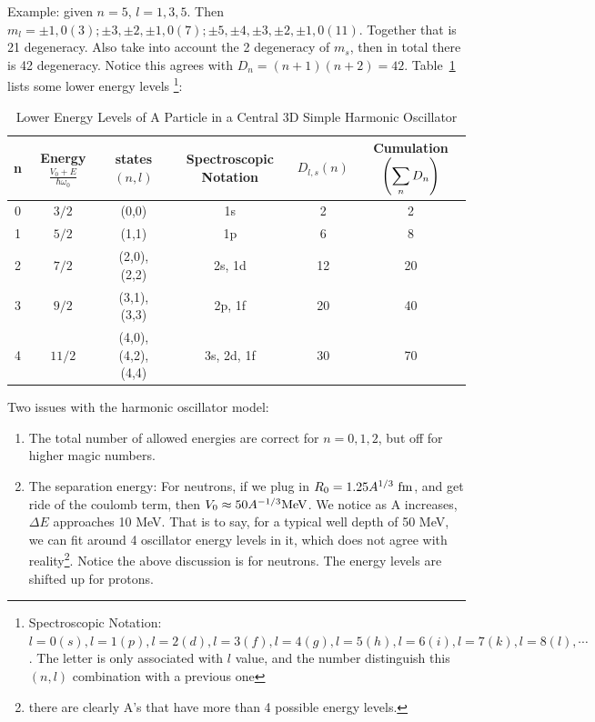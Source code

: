 \documentclass{school-22.101-notes}
\begin{document}
Example: given $n =5$, $l = 1,3,5$. Then $ m_l = \pm 1, 0 (3); \pm 3, \pm 2, \pm 1, 0 (7); \pm 5, \pm 4, \pm 3, \pm 2, \pm 1, 0 (11)$. Together that is 21 degeneracy. Also take into account the 2 degeneracy of $m_s$, then in total there is 42 degeneracy. Notice this agrees with $D_n = (n+1)(n+2) = 42$. Table~\ref{energy-SHO} lists some lower energy levels \footnote{Spectroscopic Notation: $l=0 (s), l=1 (p), l=2 (d), l=3 (f), l=4 (g), l=5(h), l=6 (i), l=7(k), l=8(l), \cdots$. The letter is only associated with $l$ value, and the number distinguish this $(n,l)$ combination with a previous one}:  
\begin{table}[h!]
    \centering
    \begin{tabular}{|c|c|c|c|c|c|} \hline
    n & Energy $\frac{V_0 + E }{\hbar \omega_0}$ & states $(n,l)$ & Spectroscopic Notation & $D_{l,s} (n)$  & Cumulation $ \left( \displaystyle\sum_n D_n \right)$ \\ \hline 
    0 & $3/2$ & (0,0) & 1s & 2 & 2 \\ \hline
    1 & $5/2$ & (1,1) & 1p & 6 & 8\\ \hline
    2 & $7/2$ & (2,0), (2,2) & 2s, 1d & 12 & 20 \\ \hline
    3 & $9/2$ & (3,1), (3,3) & 2p, 1f & 20 & 40 \\ \hline
    4 & $11/2$ & (4,0), (4,2), (4,4) & 3s, 2d, 1f & 30 & 70 \\ \hline
    \end{tabular}
    \caption{Lower Energy Levels of A Particle in a Central 3D Simple Harmonic Oscillator}
    \label{energy-SHO}
\end{table} 

Two issues with the harmonic oscillator model:  
\begin{enumerate}
\item The total number of allowed energies are correct for $n = 0,1,2$, but off for higher magic numbers.  
\item The separation energy:  
For neutrons, if we plug in $R_0 = 1.25 A^{1/3} \mbox{ } \mathrm{fm}$, and get ride of the coulomb term, then $V_0 \approx 50 A^{-1/3} \mathrm{MeV}$. We notice as A increases, $\Delta E $ approaches 10 MeV. That is to say, for a typical well depth of 50 MeV, we can fit around 4 oscillator energy levels in it, which does not agree with reality\footnote{there are clearly A's that have more than 4 possible energy levels.}. Notice the above discussion is for neutrons. The energy levels are shifted up for protons. 
\end{enumerate}
\end{document}

